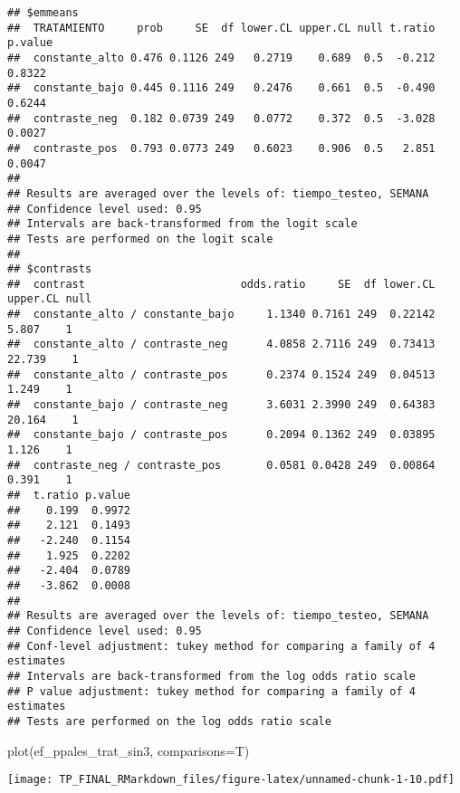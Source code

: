 \documentclass[
]{article}
\newenvironment{Shaded}{\begin{snugshade}}{\end{snugshade}}
\newcommand{\AttributeTok}[1]{\textcolor[rgb]{0.77,0.63,0.00}{#1}}
\newcommand{\FunctionTok}[1]{\textcolor[rgb]{0.00,0.00,0.00}{#1}}
\newcommand{\NormalTok}[1]{#1}
\begin{document}
\begin{verbatim}
## $emmeans
##  TRATAMIENTO     prob     SE  df lower.CL upper.CL null t.ratio p.value
##  constante_alto 0.476 0.1126 249   0.2719    0.689  0.5  -0.212  0.8322
##  constante_bajo 0.445 0.1116 249   0.2476    0.661  0.5  -0.490  0.6244
##  contraste_neg  0.182 0.0739 249   0.0772    0.372  0.5  -3.028  0.0027
##  contraste_pos  0.793 0.0773 249   0.6023    0.906  0.5   2.851  0.0047
## 
## Results are averaged over the levels of: tiempo_testeo, SEMANA 
## Confidence level used: 0.95 
## Intervals are back-transformed from the logit scale 
## Tests are performed on the logit scale 
## 
## $contrasts
##  contrast                        odds.ratio     SE  df lower.CL upper.CL null
##  constante_alto / constante_bajo     1.1340 0.7161 249  0.22142    5.807    1
##  constante_alto / contraste_neg      4.0858 2.7116 249  0.73413   22.739    1
##  constante_alto / contraste_pos      0.2374 0.1524 249  0.04513    1.249    1
##  constante_bajo / contraste_neg      3.6031 2.3990 249  0.64383   20.164    1
##  constante_bajo / contraste_pos      0.2094 0.1362 249  0.03895    1.126    1
##  contraste_neg / contraste_pos       0.0581 0.0428 249  0.00864    0.391    1
##  t.ratio p.value
##    0.199  0.9972
##    2.121  0.1493
##   -2.240  0.1154
##    1.925  0.2202
##   -2.404  0.0789
##   -3.862  0.0008
## 
## Results are averaged over the levels of: tiempo_testeo, SEMANA 
## Confidence level used: 0.95 
## Conf-level adjustment: tukey method for comparing a family of 4 estimates 
## Intervals are back-transformed from the log odds ratio scale 
## P value adjustment: tukey method for comparing a family of 4 estimates 
## Tests are performed on the log odds ratio scale
\end{verbatim}

\begin{Shaded}
\begin{Highlighting}[]
\FunctionTok{plot}\NormalTok{(ef\_ppales\_trat\_sin3, }\AttributeTok{comparisons=}\NormalTok{T)}
\end{Highlighting}
\end{Shaded}

\texttt{[image: TP\_FINAL\_RMarkdown\_files/figure-latex/unnamed-chunk-1-10.pdf]}
\end{document}
